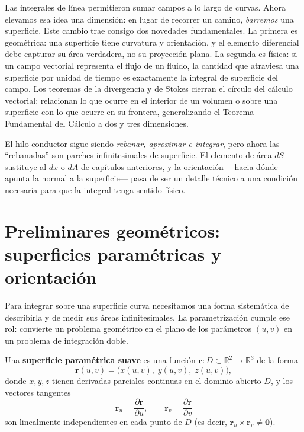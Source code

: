 Las integrales de línea permitieron sumar campos a lo largo de curvas. Ahora elevamos esa idea una dimensión: en lugar de recorrer un camino, \emph{barremos} una superficie. Este cambio trae consigo dos novedades fundamentales. La primera es geométrica: una superficie tiene curvatura y orientación, y el elemento diferencial debe capturar su área verdadera, no su proyección plana. La segunda es física: si un campo vectorial representa el flujo de un fluido, la cantidad que atraviesa una superficie por unidad de tiempo es exactamente la integral de superficie del campo. Los teoremas de la divergencia y de Stokes cierran el círculo del cálculo vectorial: relacionan lo que ocurre en el interior de un volumen o sobre una superficie con lo que ocurre en su frontera, generalizando el Teorema Fundamental del Cálculo a dos y tres dimensiones.

\begin{rem}
El hilo conductor sigue siendo \emph{rebanar, aproximar e integrar}, pero ahora las ``rebanadas'' son parches infinitesimales de superficie. El elemento de área $dS$ sustituye al $dx$ o $dA$ de capítulos anteriores, y la orientación —hacia dónde apunta la normal a la superficie— pasa de ser un detalle técnico a una condición necesaria para que la integral tenga sentido físico.
\end{rem}

\section{Preliminares geométricos: superficies paramétricas y orientación}

Para integrar sobre una superficie curva necesitamos una forma sistemática de describirla y de medir sus áreas infinitesimales. La parametrización cumple ese rol: convierte un problema geométrico en el plano de los parámetros $(u,v)$ en un problema de integración doble.

\begin{definition}
Una \textbf{superficie paramétrica suave} es una función $\mathbf{r}: D \subset \mathbb{R}^2 \to \mathbb{R}^3$ de la forma
\[
\mathbf{r}(u,v) = \bigl( x(u,v),\; y(u,v),\; z(u,v) \bigr),
\]
donde $x,y,z$ tienen derivadas parciales continuas en el dominio abierto $D$, y los vectores tangentes
\[
\mathbf{r}_u = \frac{\partial \mathbf{r}}{\partial u}, \qquad
\mathbf{r}_v = \frac{\partial \mathbf{r}}{\partial v}
\]
son linealmente independientes en cada punto de $D$ (es decir, $\mathbf{r}_u \times \mathbf{r}_v \neq \mathbf{0}$).
\end{definition}

